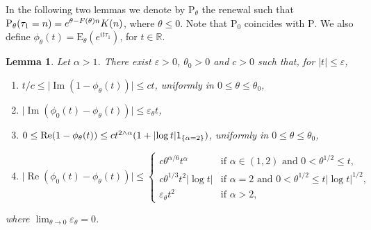 \documentclass[10pt]{amsart}
\newtheorem{lemm}[theo]{Lemma}\newtheorem{prop}[theo]{Proposition}\newtheorem{coro}[theo]{Corollary}\newtheorem{conj}[theo]{Conjecture}
\theoremstyle{definition}\newtheorem{defi}[theo]{Definition}\newtheorem{rema}[theo]{Remark}\newtheorem{exam}[theo]{Example}\newtheorem{exem}[theo]{Example}\newtheorem{nota}[theo]{Notation}
\DeclareMathOperator{\re}{Re}
\DeclareMathOperator{\im}{Im}
\newcommand{\bbR}{{\ensuremath{\mathbb R}}}
\newcommand{\ga}{\alpha}
\newcommand{\gep}{\varepsilon}
\newcommand{\gt}{\theta}
\newcommand\bP{\ensuremath{\mathrm{P}}}
\newcommand\bE{\ensuremath{\mathrm{E}}}
\newcommand{\ind}{{\sf 1}}
\begin{document}
In the following two lemmas we denote by $\bP_\gt$ the renewal such that $\bP_\gt(\tau_1 = n) =\linebreak e^{\gt - F(\gt) n} K(n)$, where $\gt\le 0$. Note that $\bP_0$ coincides with $\bP$. We also define $\phi_\gt(t) = \bE_\gt(e^{i t \tau_1})$, for $t\in\bbR$.

\begin{lemm}\label{lem:UnifEstimatesCFs}
Let $\ga > 1$. There exist $\gep>0$, $\gt_0>0$ and $c>0$ such that, for $|t| \le \gep$,
\begin{enumerate}
\item \label{A.9.1} $t/c \le \mathopen{|}\im(1- \phi_\gt(t))| \le ct$, uniformly in $0 \le \gt \le \gt_0$,
\item \label{A.9.2} $\mathopen{|}\im(\phi_0(t) -\phi_\gt(t))| \le \gep_\gt t$,
\item \label{A.9.3} $0 \le \re(1- \phi_\gt(t)) \le ct^{2\wedge \ga}{(1+ \mathopen{|}\log t|\ind_{\{\ga = 2\}})}$, uniformly in $0\le \gt \le \gt_0$,
\item \label{A.9.4} $\mathopen{|}\re(\phi_0(t) -\phi_\gt(t))| \le
\begin{cases}
c \gt^{\ga / 6} t^\ga& \text{if } \ga\in(1,2) \text{ and } 0 < \gt^{1/2} \le t,\\[2pt] { c \gt^{1/3} t^2 \mathopen{|}\log t|} & \text{if } \ga=2 \text{ and } 0 < \gt^{1/2} \le t\mathopen{|}\log t|^{1/2},\\[2pt]
\gep_\gt t^2& \text{if } \ga> 2,
\end{cases}$
\end{enumerate}
where $\lim_{\gt\to 0} \gep_\gt = 0$.
\end{lemm}
\end{document}
